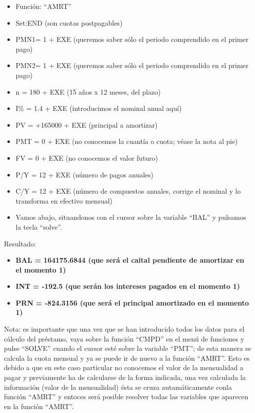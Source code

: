 \documentclass[
  letterpaper,
  DIV=11,
  numbers=noendperiod]{scrreprt}
\begin{document}
\begin{tcolorbox}[enhanced jigsaw, left=2mm, opacityback=0, colback=white, breakable, arc=.35mm, bottomrule=.15mm, rightrule=.15mm, toprule=.15mm, leftrule=.75mm, colframe=quarto-callout-tip-color-frame]
\begin{minipage}[t]{\textwidth - 5.5mm}
\begin{itemize}
\item
  Función: ``AMRT''
\item
  Set:END (son cuotas postpagables)
\item
  PMN1= 1 + EXE (queremos saber sólo el periodo comprendido en el primer
  pago)
\item
  PMN2= 1 + EXE (queremos saber sólo el periodo comprendido en el primer
  pago)
\item
  n = 180 + EXE (15 años x 12 meses, del plazo)
\item
  I\% = 1.4 + EXE (introducimos el nominal anual aquí)
\item
  PV = +165000 + EXE (principal a amortizar)
\item
  PMT = 0 + EXE (no conocemos la cuantía o cuota; véase la nota al pie)
\item
  FV = 0 + EXE (no conocemos el valor futuro)
\item
  P/Y = 12 + EXE (número de pagos anuales)
\item
  C/Y = 12 + EXE (número de compuestos anuales, corrige el nominal y lo
  transforma en efectivo mensual)
\item
  Vamos abajo, situandonos con el cursor sobre la variable ``BAL'' y
  pulsamos la tecla ``solve''.
\end{itemize}

Resultado:

\begin{itemize}
\item
  \textbf{BAL = 164175.6844 (que será el caital pendiente de amortizar
  en el momento 1)}
\item
  \textbf{INT = -192.5 (que serán los intereses pagados en el momento
  1)}
\item
  \textbf{PRN = -824.3156 (que será el principal amortizado en el
  momento 1)}
\end{itemize}

Nota: es importante que una vez que se han introducido todos los datos
para el cálculo del préstamo, vaya sobre la función ``CMPD'' en el menú
de funciones y pulse ``SOLVE'' cuando el cursor esté sobre la variable
``PMT''; de esta manera se calcula la cuota mensual y ya se puede ir de
nuevo a la función ``AMRT''. Esto es debido a que en este caso
particular no conocemos el valor de la mensualidad a pagar y previamente
ha de calcularse de la forma indicada, una vez calculada la información
(valor de la mensualidad) ésta se cruza autamáticamente conla función
``AMRT'' y entoces será posible resolver todas las variables que
aparecen en la función ``AMRT''.

\end{minipage}%
\end{tcolorbox}
\end{document}
